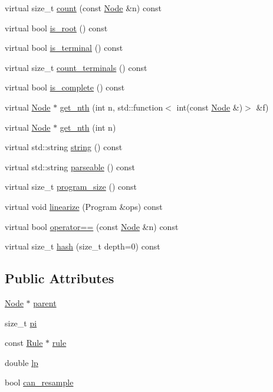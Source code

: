 \begin{DoxyCompactItemize}
virtual size\+\_\+t \hyperlink{class_node_a0cc58478d98361566830a8d3db745718}{count} (const \hyperlink{class_node}{Node} \&n) const
\item 
virtual bool \hyperlink{class_node_ad12a96da2fe796616aa22e20429f41d5}{is\+\_\+root} () const
\item 
virtual bool \hyperlink{class_node_ac3c263a4e0c734c34aaf62f80f84cd9a}{is\+\_\+terminal} () const
\item 
virtual size\+\_\+t \hyperlink{class_node_a70c820eaeaa852e3c0a46cf006026c1b}{count\+\_\+terminals} () const
\item 
virtual bool \hyperlink{class_node_ac2e36754ba8b1b1d452deeb2bdbd346f}{is\+\_\+complete} () const
\item 
virtual \hyperlink{class_node}{Node} $\ast$ \hyperlink{class_node_a93fc84b584f080593978d3a39631d3e5}{get\+\_\+nth} (int n, std\+::function$<$ int(const \hyperlink{class_node}{Node} \&)$>$ \&f)
\item 
virtual \hyperlink{class_node}{Node} $\ast$ \hyperlink{class_node_a224c0ee6dae35ddce70f8fd3b91e0b1c}{get\+\_\+nth} (int n)
\item 
virtual std\+::string \hyperlink{class_node_a0590ae269543416be9c4ebdf70bad73b}{string} () const
\item 
virtual std\+::string \hyperlink{class_node_a70e879ceb71f47787137572d9bee8efa}{parseable} () const
\item 
virtual size\+\_\+t \hyperlink{class_node_a377548bcf1be99ac5181f9434c33c81e}{program\+\_\+size} () const
\item 
virtual void \hyperlink{class_node_ac995508e96e112675fde53e7748e41bc}{linearize} (Program \&ops) const
\item 
virtual bool \hyperlink{class_node_a90aeee00ccda27f36bea9cdd774eae8d}{operator==} (const \hyperlink{class_node}{Node} \&n) const
\item 
virtual size\+\_\+t \hyperlink{class_node_a212f2e1ba4ff71de6954b0b791d89979}{hash} (size\+\_\+t depth=0) const
\end{DoxyCompactItemize}
\subsection*{Public Attributes}
\begin{DoxyCompactItemize}
\item 
\hyperlink{class_node}{Node} $\ast$ \hyperlink{class_node_ad8184598cdea70e4bbdfd76f2b0f9e85}{parent}
\item 
size\+\_\+t \hyperlink{class_node_ad8e140a5af4e5c312141f2b7af255520}{pi}
\item 
const \hyperlink{class_rule}{Rule} $\ast$ \hyperlink{class_node_a02f5c9463cceb270ad5730760f19c722}{rule}
\item 
double \hyperlink{class_node_a298eaa3743b774a3f9ef396e1dc42a08}{lp}
\item 
bool \hyperlink{class_node_a98c14a51b240fbc7e438f40a12276257}{can\+\_\+resample}
\end{DoxyCompactItemize}
